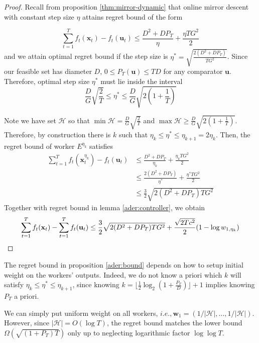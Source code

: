 \documentclass[12pt, a4paper]{report}
\begin{document}
\begin{proof}
Recall from proposition \ref{thm:mirror-dynamic} that online mirror descent with constant step size $\eta$ attains regret bound of the form

\begin{equation*}
    \sum_{t=1}^T f_t(\mathbf{x}_t) - f_t(\mathbf{u}_t) \leq \frac{D^2 + DP_T}{\eta} + \frac{\eta TG^2}{2}
\end{equation*}
and we attain optimal regret bound if the step size is $\eta^* = \sqrt{\frac{2(D^2 + DP_T)}{TG^2}}$. 
Since our feasible set has diameter $D$, $0 \leq P_T(\mathbf{u}) \leq TD$ for any comparator $\mathbf{u}$. Therefore, optimal step size $\eta^*$ must lie inside the interval
\begin{equation*}
    \frac{D}{G}\sqrt{\frac{2}{T}} \leq \eta^* \leq \frac{D}{G}\sqrt{2\left(1 + \frac{1}{T}\right)}
\end{equation*}

Note we have set $\mathcal{H}$ so that $\min \mathcal{H} = \frac{D}{G}\sqrt{\frac{2}{T}}$ and $\max \mathcal{H} \geq \frac{D}{G}\sqrt{2 \left(1 + \frac{1}{T}\right)}$. Therefore, by construction there is $k$ such that $\eta_k \leq \eta^* \leq \eta_{k+1} = 2\eta_k$. Then, the regret bound of worker $E^{\eta_k}$ satisfies
\begin{align*}
    \sum_{t=1}^T f_t(\mathbf{x}_t^{\eta_k}) - f_t(\mathbf{u}_t) &\leq \frac{D^2 + DP_T}{\eta_k} + \frac{\eta_k TG^2}{2}
    \\
    &\leq \frac{2(D^2 + DP_T)}{\eta^*} + \frac{\eta^* TG^2}{2}
    \\
    &\leq \frac{3}{2}\sqrt{2(D^2 + DP_T)TG^2}
\end{align*}
Together with regret bound in lemma \ref{ader:controller}, we obtain 
\begin{equation*}
    \sum_{t=1}^T f_t(\mathbf{x}_t) - \sum_{t=1}^T f_t(\mathbf{u}_t) \leq \frac{3}{2}\sqrt{2(D^2 + DP_T)TG^2} + \frac{\sqrt{2Tc^2}}{2}(1 - \log w_{1, \eta_k}) \qedhere
\end{equation*}
\end{proof}

The regret bound in proposition \ref{ader:bound} depends on how to setup initial weight on the workers' outputs. Indeed, we do not know a priori which $k$ will satisfy $\eta_k \leq \eta^* \leq \eta_{k+1}$, since knowing $k = \lfloor \frac{1}{2} \log_2 (1+ \frac{P_T}{D}) \rfloor + 1$ implies knowing $P_T$ a priori. 

We can simply put uniform weight on all workers, $i.e., \mathbf{w}_1 = (1/|\mathcal{H}|, \dots, 1 / |\mathcal{H}|)$. However, since $|\mathcal{H}| = O(\log T)$, the regret bound matches the lower bound $\Omega(\sqrt{(1+P_T)T})$ only up to neglecting logarithmic factor $\log \log T$.
\end{document}
